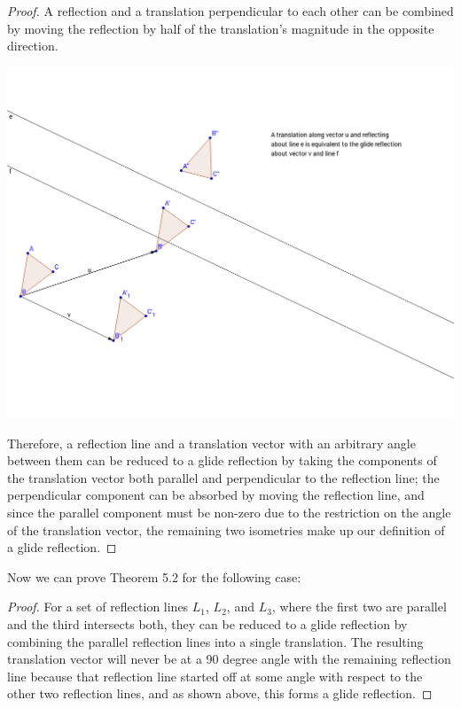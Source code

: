 \documentclass[11pt]{article}
\theoremstyle{definition}
\begin{document}
\begin{proof}
  A reflection and a translation perpendicular to each other can be combined by
  moving the reflection by half of the translation's magnitude in the opposite
  direction.



  \includegraphics[scale=.4]{glide}



  Therefore, a reflection line and a translation vector with an arbitrary angle
  between them can be reduced to a glide reflection by taking the components of
  the translation vector both parallel and perpendicular to the reflection
  line; the perpendicular component can be absorbed by moving the reflection
  line, and since the parallel component must be non-zero due to the
  restriction on the angle of the translation vector, the remaining two
  isometries make up our definition of a glide reflection.
\end{proof}

Now we can prove Theorem 5.2 for the following case:

\begin{proof}
  For a set of reflection lines $L_{1}$, $L_{2}$, and $L_{3}$, where the first
  two are parallel and the third intersects both, they can be reduced to a
  glide reflection by combining the parallel reflection lines into a single
  translation. The resulting translation vector will never be at a 90 degree
  angle with the remaining reflection line because that reflection line started
  off at some angle with respect to the other two reflection lines, and as
  shown above, this forms a glide reflection.
\end{proof}
\end{document}
